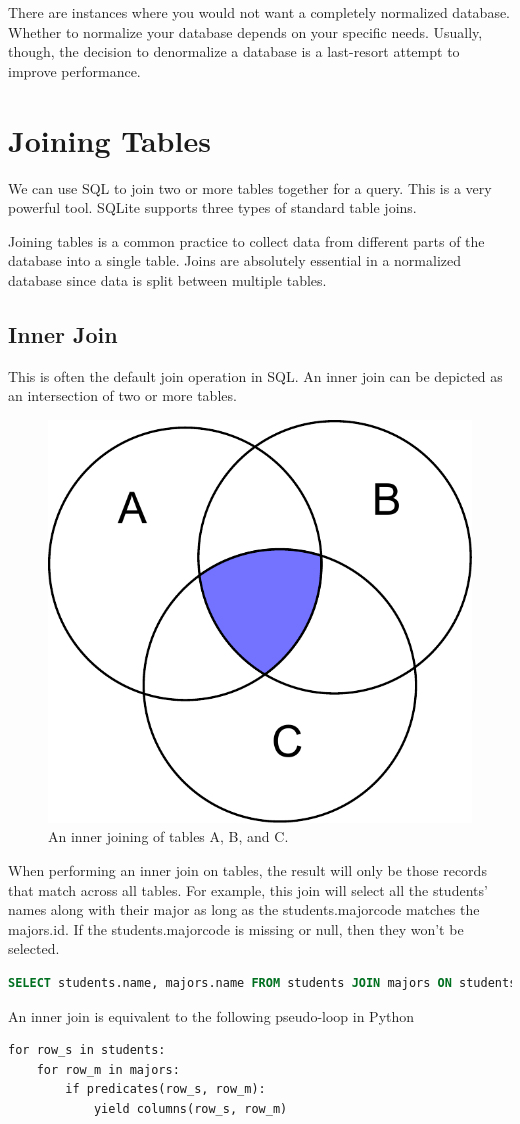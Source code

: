 \begin{info}
There are instances where you would not want a completely normalized database.
Whether to normalize your database depends on your specific needs.
Usually, though, the decision to denormalize a database is a last-resort attempt to improve performance.
\end{info}

\section*{Joining Tables}
We can use SQL to join two or more tables together for a query.
This is a very powerful tool.
SQLite supports three types of standard table joins.

Joining tables is a common practice to collect data from different parts of the database into a single table.
Joins are absolutely essential in a normalized database since data is split between multiple tables.

\subsection*{Inner Join}
This is often the default join operation in SQL.
An inner join can be depicted as an intersection of two or more tables.
\begin{figure}
\centering
\includegraphics[width=.5\textwidth]{figures/inner_join.pdf}
\caption{An inner joining of tables A, B, and C.}
\label{fig:inner_join}
\end{figure}
When performing an inner join on tables, the result will only be those records that match across all tables.
For example, this join will select all the students' names along with their major as long as the students.majorcode matches the majors.id.
If the students.majorcode is missing or null, then they won't be selected.
\begin{lstlisting}[language=SQL]
SELECT students.name, majors.name FROM students JOIN majors ON students.majorcode=majors.id;
\end{lstlisting}
An inner join is equivalent to the following pseudo-loop in Python
\begin{lstlisting}
for row_s in students:
    for row_m in majors:
        if predicates(row_s, row_m):
            yield columns(row_s, row_m)
\end{lstlisting}

